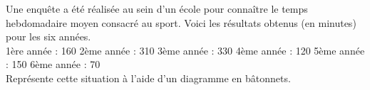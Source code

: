 %
%
	Une enquête a été réalisée au sein d’un école pour connaître le temps hebdomadaire moyen consacré au sport. Voici les résultats obtenus (en minutes) pour les six années. \\
	1ère année : 160 \hfill 2ème année : 310 \hfill 3ème année : 330 \hfill 4ème année : 120 \hfill 5ème année : 150 \hfill 6ème année : 70 \\
	Représente cette situation à l’aide d’un diagramme en bâtonnets.
